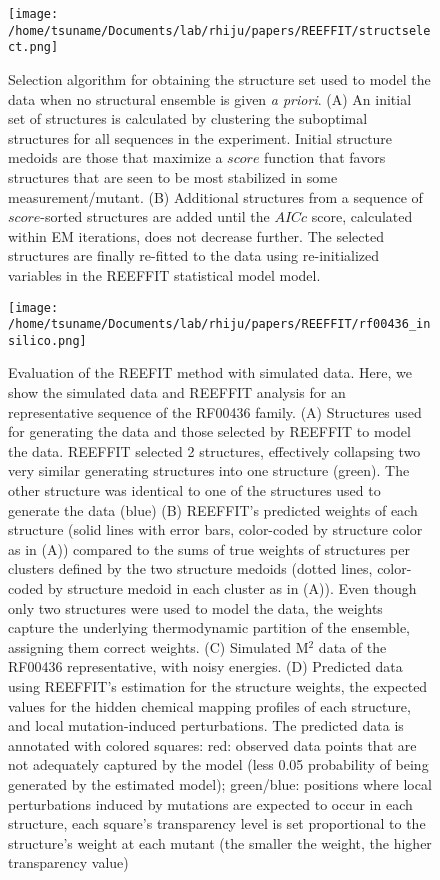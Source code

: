 \documentclass[12pt]{article}
\begin{document}
\begin{figure}[here]
\texttt{[image: /home/tsuname/Documents/lab/rhiju/papers/REEFFIT/structselect.png]}
\caption{Selection algorithm for obtaining the structure set used to model the data when no structural ensemble is given \textit{a priori}. (A) An initial set of structures is calculated by clustering the suboptimal structures for all sequences in the experiment. Initial structure medoids are those that maximize a $score$ function that favors structures that are seen to be most stabilized in some measurement/mutant. (B) Additional structures from a sequence of $score$-sorted structures are added until the $AICc$ score, calculated within EM iterations, does not decrease further. The selected structures are finally re-fitted to the data using re-initialized variables in the REEFFIT statistical model model.}
\label{fig:structselectfig}
\end{figure}


\begin{figure}[here]
\texttt{[image: /home/tsuname/Documents/lab/rhiju/papers/REEFFIT/rf00436\_insilico.png]}
\caption{Evaluation of the REEFIT method with simulated data. Here, we show the simulated data and REEFFIT analysis for an representative sequence of the RF00436 family. (A) Structures used for generating the data and those selected by REEFFIT to model the data. REEFFIT selected 2 structures, effectively collapsing two very similar generating structures into one structure (green). The other structure was identical to one of the structures used to generate the data (blue) (B) REEFFIT's predicted weights of each structure (solid lines with error bars, color-coded by structure color as in (A)) compared to the sums of true weights of structures per clusters defined by the two structure medoids (dotted lines, color-coded by structure medoid in each cluster as in (A)). Even though only two structures were used to model the data, the weights capture the underlying thermodynamic partition of the ensemble, assigning them correct weights. (C) Simulated M$^2$ data of the RF00436 representative, with noisy energies.  (D) Predicted data using REEFFIT's estimation for the structure weights, the expected values for the hidden chemical mapping profiles of each structure, and local mutation-induced perturbations. The predicted data is annotated with colored squares: red: observed data points that are not adequately captured by the model (less 0.05 probability of being generated by the estimated model); green/blue: positions where local perturbations induced by mutations are expected to occur in each structure, each square's transparency level is set proportional to the structure's weight at each mutant (the smaller the weight, the higher transparency value)}
\label{fig:insilicofig}
\end{figure}
\end{document}

